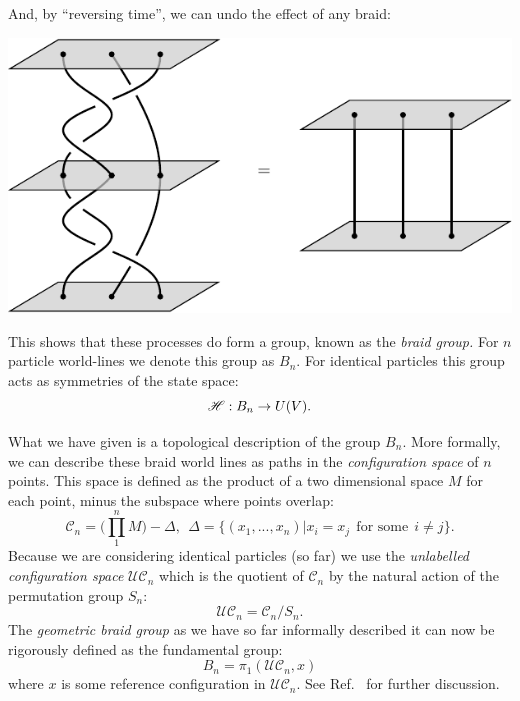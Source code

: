 And, by ``reversing time'', we can undo the effect of
any braid:
\begin{center}
\includegraphics[]{pic-braid-inverse.pdf}
\end{center}
This shows that these processes do form a group,
known as the \emph{braid group.}
For $n$ particle world-lines we denote this group as $B_n.$
For identical particles this group acts as symmetries of the
state space:
$$
    \mathscr{H} : B_n \to U(V).
$$

What we have given is a topological description of the group $B_n$.
More formally, we can describe these braid world lines as
paths in the \emph{configuration space} of $n$ points.
\newcommand{\Conf}{\mathcal{C}}
\newcommand{\UConf}{\mathcal{UC}}
This space is defined as the product of
a two dimensional space $M$ for each point, minus the subspace where points overlap:
$$
    \Conf_n = \bigl( \prod_{1}^{n} M \bigr) - \Delta, \ \ 
    \Delta = \{(x_1, ..., x_n) | x_i = x_j \ \ \mbox{for some} \ \ i\ne j \}.
$$
Because we are considering identical particles (so far)
we use the \emph{unlabelled configuration space}
$\UConf_n$ which is the quotient of $\Conf_n$ by the natural action of the
permutation group $S_n:$
$$
    \UConf_n = \Conf_n / S_n.
$$
The \emph{geometric braid group} as we have so far informally described it 
can now be rigorously defined as the fundamental group:
$$
    B_n = \pi_1 ( \UConf_n, x )
$$
where $x$ is some reference configuration in $\UConf_n.$
See Ref.~\cite{Ghrist2014} for further discussion.

